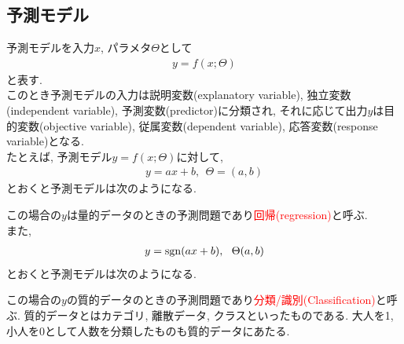 \documentclass[dvipdfmx,a4j]{jsarticle}
\begin{document}
\subsection{予測モデル}
予測モデルを入力$x$, パラメタ$\Theta$として
\begin{eqnarray*}
    y=f(x;\Theta)
\end{eqnarray*}
と表す.\\
このとき予測モデルの入力は説明変数(explanatory variable), 独立変数(independent variable), 予測変数(predictor)に分類され, それに応じて出力$y$は目的変数(objective variable), 従属変数(dependent variable), 応答変数(response variable)となる. \\
たとえば, 予測モデル$y=f(x;\Theta)$に対して,
\begin{eqnarray*}
    y=ax+b,\ \ \Theta = (a,b)
\end{eqnarray*}
とおくと予測モデルは次のようになる.
\begin{center}
\end{center}
この場合の$y$は量的データのときの予測問題であり\textcolor{red}{回帰(regression)}と呼ぶ.\\
また,
\begin{eqnarray*}
    y={\rm sgn}(ax+b),\ \ \Theta(a,b)
\end{eqnarray*}
とおくと予測モデルは次のようになる.
\begin{center}
\end{center}
この場合の$y$の質的データのときの予測問題であり\textcolor{red}{分類/識別(Classification)}と呼ぶ. 質的データとはカテゴリ, 離散データ, クラスといったものである. 大人を1, 小人を0として人数を分類したものも質的データにあたる.
\end{document}
